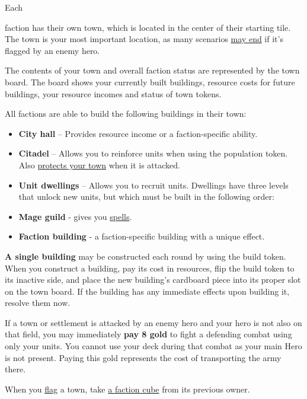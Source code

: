 \hypertarget{Town}{Each} faction has their own town, which is located in the center of their starting tile.
The town is your most important location, as many scenarios \hyperlink{End}{may end} if it's flagged by an enemy hero.\par
The contents of your town and overall faction status are represented by the town board.
The board shows your currently built buildings, resource costs for future buildings, your resource incomes and status of town tokens.\par
All factions are able to build the following buildings in their town:
\begin{itemize}
  \item \textbf{City hall} – Provides resource income or a faction-specific ability.
  \item \textbf{Citadel} – Allows you to reinforce units when using the population token.
Also \hyperlink{Walls}{protects your town} when it is attacked.
  \item \textbf{Unit dwellings} – Allows you to recruit units.
Dwellings have three levels that unlock new units, but which must be built in the following order:
  \item \textbf{Mage guild} - gives you \hyperlink{spells}{spells}.
  \item \textbf{Faction building} - a faction-specific building with a unique effect.
\end{itemize}
\textbf{A single building} may be constructed each round by using the build token.
When you construct a building, pay its cost in resources, flip the build token to its inactive side, and place the new building’s cardboard piece into its proper slot on the town board.
If the building has any immediate effects upon building it, resolve them now.\par
If a town or settlement is attacked by an enemy hero and your hero is not also on that field, you may immediately \textbf{pay 8 gold} to fight a defending combat using only your units.
You cannot use your deck during that combat as your main Hero is not present.
Paying this gold represents the cost of transporting the army there.\par
When you \hyperlink{Categories}{flag} a town, take \hyperlink{End}{a faction cube} from its previous owner.
